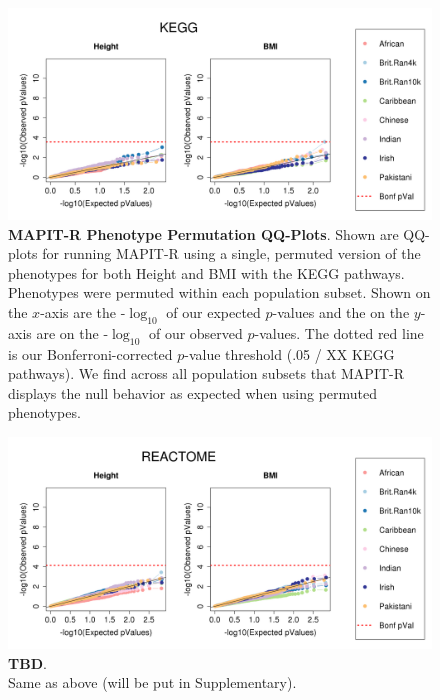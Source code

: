 \documentclass[12pt, a4paper]{article}
\begin{document}
\begin{figure}[htbp]
\centering
\includegraphics[scale=.35]{Images/Supp/InterPath_Supp_Figure_perm1_QQPlots_KEGG_vs1.png}
\caption[TBD]{\textbf{MAPIT-R Phenotype Permutation QQ-Plots}. Shown are QQ-plots for running MAPIT-R using a single, permuted version of the phenotypes for both Height and BMI with the KEGG pathways. Phenotypes were permuted within each population subset. Shown on the $x$-axis are the -$\log_{10}$ of our expected $p$-values and the on the $y$-axis are on the -$\log_{10}$ of our observed $p$-values. The dotted red line is our Bonferroni-corrected $p$-value threshold (.05 / XX KEGG pathways). We find across all population subsets that MAPIT-R displays the null behavior as expected when using permuted phenotypes.}
\label{InterPath-Supp-Figure-perm1-QQPlots-KEGG}
\end{figure}
\clearpage

\begin{figure}[htbp]
\centering
\includegraphics[scale=.35]{Images/Supp/InterPath_Supp_Figure_perm1_QQPlots_REACTOME_vs1.png}
\caption[TBD]{\textbf{TBD}. \\ Same as above (will be put in Supplementary).}
\label{InterPath-Supp-Figure-perm1-QQPlots-REACTOME}
\end{figure}
\end{document}
